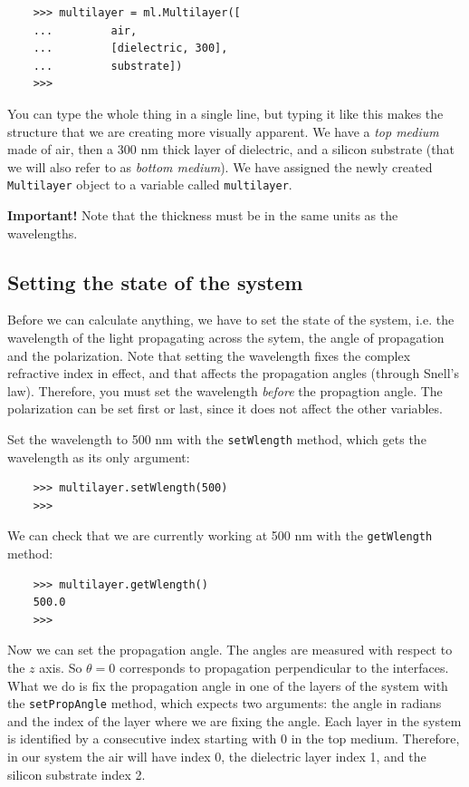 \documentclass[a4paper,11pt,aps,final]{revtex4}
\begin{document}
\begin{verbatim}
    >>> multilayer = ml.Multilayer([
    ...         air,
    ...         [dielectric, 300],
    ...         substrate])
    >>>
\end{verbatim}

You can type the whole thing in a single line, but typing it like this makes the structure that we are creating more visually apparent. We have a \emph{top medium} made of air, then a 300 nm thick layer of dielectric, and a silicon substrate (that we will also refer to as \emph{bottom medium}). We have assigned the newly created \texttt{Multilayer} object to a variable called \texttt{multilayer}.

\textbf{Important!} Note that the thickness must be in the same units as the wavelengths.

\subsection{Setting the state of the system}

Before we can calculate anything, we have to set the state of the system, i.e. the wavelength of the light propagating across the sytem, the angle of propagation and the polarization. Note that setting the wavelength fixes the complex refractive index in effect, and that affects the propagation angles (through Snell's law). Therefore, you must set the wavelength \emph{before} the propagtion angle. The polarization can be set first or last, since it does not affect the other variables.

Set the wavelength to 500 nm with the \texttt{setWlength} method, which gets the wavelength as its only argument:

\begin{verbatim}
    >>> multilayer.setWlength(500)
    >>>
\end{verbatim}

We can check that we are currently working at 500 nm with the \texttt{getWlength} method:

\begin{verbatim}
    >>> multilayer.getWlength()
    500.0
    >>>
\end{verbatim}


Now we can set the propagation angle. The angles are measured with respect to the $z$ axis. So $\theta = 0$ corresponds to propagation perpendicular to the interfaces. What we do is fix the propagation angle in one of the layers of the system with the \texttt{setPropAngle} method, which expects two arguments: the angle in radians and the index of the layer where we are fixing the angle. Each layer in the system is identified by a consecutive index starting with 0 in the top medium. Therefore, in our system the air will have index 0, the dielectric layer index 1, and the silicon substrate index 2.
\end{document}
